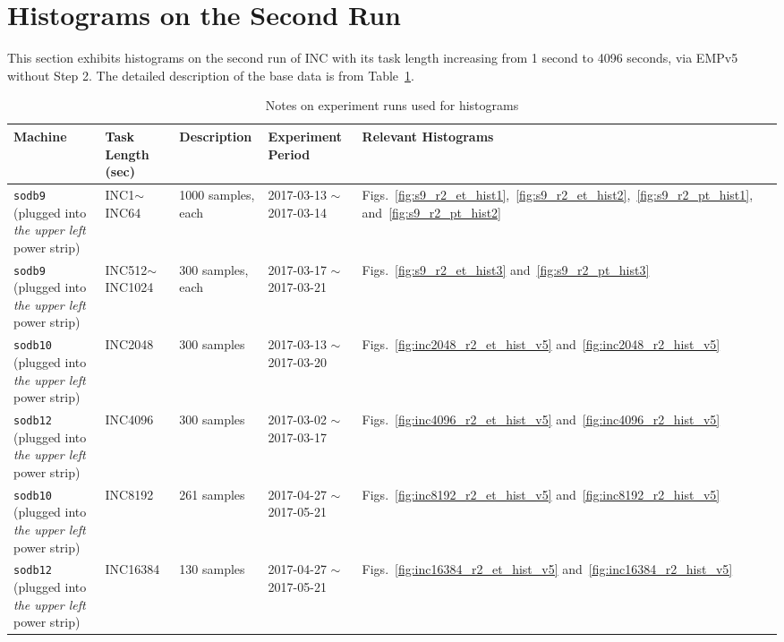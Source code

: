 \section{Histograms on the Second Run~\label{sec:sodb9_r2_hist}} 
This section exhibits histograms on the second run of 
INC with its task length increasing from 1 second to 4096 seconds, via EMPv5 without Step 2. 
The detailed description of the base data is from Table~\ref{tab:exp_notes2}.

\begin{table}[h]
\begin{center}
\begin{tabular}{|p{2cm}|p{3cm}|p{3cm}|p{4cm}|p{3.5cm}|} \hline
Machine & Task Length (sec) & Description & Experiment Period & Relevant \linebreak Histograms\\ \hline
{\tt sodb9} (plugged into {\em the upper left} power strip) &  INC1$\sim$INC64 & 1000 samples, each & 2017-03-13 $\sim$ 2017-03-14 & Figs.~\ref{fig:s9_r2_et_hist1},~\ref{fig:s9_r2_et_hist2},~\ref{fig:s9_r2_pt_hist1}, and~\ref{fig:s9_r2_pt_hist2}\\ \hline
{\tt sodb9} (plugged into {\em the upper left} power strip) &  INC512$\sim$INC1024 & 300 samples, each & 2017-03-17 $\sim$ 2017-03-21 & 
Figs.~\ref{fig:s9_r2_et_hist3} and~\ref{fig:s9_r2_pt_hist3}\\ \hline
{\tt sodb10} (plugged into {\em the upper left} power strip) & INC2048 & 300 samples & 2017-03-13 $\sim$ 2017-03-20 & Figs.~\ref{fig:inc2048_r2_et_hist_v5} and~\ref{fig:inc2048_r2_hist_v5}\\ \hline
{\tt sodb12} (plugged into {\em the upper left} power strip) & INC4096 & 300 samples & 2017-03-02 $\sim$ 2017-03-17 & Figs.~\ref{fig:inc4096_r2_et_hist_v5} and~\ref{fig:inc4096_r2_hist_v5}\\ \hline
{\tt sodb10} (plugged into {\em the upper left} power strip) & INC8192& 261 samples & 2017-04-27 $\sim$ 2017-05-21 & Figs.~\ref{fig:inc8192_r2_et_hist_v5} and~\ref{fig:inc8192_r2_hist_v5}\\ \hline
{\tt sodb12} (plugged into {\em the upper left} power strip) & INC16384& 130 samples & 2017-04-27 $\sim$ 2017-05-21 & Figs.~\ref{fig:inc16384_r2_et_hist_v5} and~\ref{fig:inc16384_r2_hist_v5}\\ \hline
\end{tabular}
\end{center}
\vspace{-.2in}
\caption{Notes on experiment runs used for histograms\label{tab:exp_notes2}}
\end{table}

